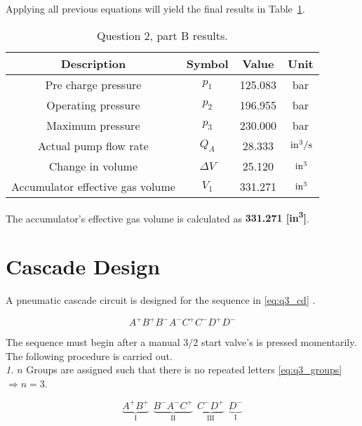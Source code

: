 Applying all previous equations will yield the final results in Table~\ref{tab:q2c_ans}.
\begin{table}[H]
	\centering
	\caption{Question 2, part B results.}
	\begin{tabular}{cccc}
		\toprule
		\textbf{Description}             & \textbf{Symbol} & \textbf{Value } & \textbf{Unit}   \\
		\midrule
		Pre charge pressure              & $p_1$           & 125.083         & bar             \\
		Operating pressure               & $p_2$           & 196.955         & bar             \\
		Maximum pressure                 & $p_3$           & 230.000         & bar             \\
		Actual pump flow rate            & $Q_A$           & 28.333          & $\,\mathrm{in^3/s}$ \\
		Change in volume                 & $\Delta V$      & 25.120          & $\,\mathrm{in^3}$   \\
		Accumulator effective gas volume & $V_1$           & 331.271          & $\,\mathrm{in^3}$   \\
		\bottomrule
	\end{tabular}
	\label{tab:q2c_ans}
\end{table}

The accumulator's effective gas volume is calculated as \textbf{331.271 [in\textsuperscript{3}]}.

\chapter{Cascade Design}
\label{chap:q3}

A pneumatic cascade circuit is designed for the sequence in \ref{eq:q3_cd} \cite{assign}.

\begin{equation}
	\label{eq:q3_cd}
	A^+ B^+ B^- A^- C^+ C^- D^+ D^- 	
\end{equation}

The sequence must begin after a manual 3/2 start valve's is pressed momentarily. The following procedure is carried out.\\

\textit{1.} $n$ Groups are assigned such that there is no repeated letters \ref{eq:q3_groups} $\Rightarrow n=3$.

\begin{equation}
	\label{eq:q3_groups}
	\underbrace{A^+ B^+}_\text{I} \ \ \underbrace{B^- A^- C^+}_\text{II} \ \ \underbrace{C^- D^+}_\text{III} \ \ \underbrace{D^-}_\text{I}	
\end{equation}
\\

